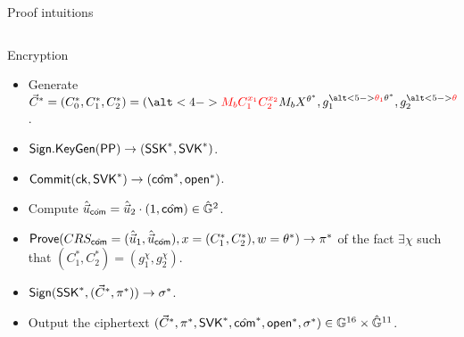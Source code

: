 \begin{frame}{Proof intuitions}
\begin{columns}
\begin{column}{0.5\textwidth}
      Encryption
    \begin{itemize}
    \item Generate $\vec{C}^* = (C_0^*, C_1^*, C_2^*) = (\alt<4->{{\color{red}M_bC_1^{x_1}C_2^{x_2}}}{ M_bX^{\theta^*}}, g_1^{\alt<5->{{\color{red}\theta_1}}{\theta^*}},  g_2^{\alt<5->{{\color{red}\theta_2}}{\theta^*}})$.
    \item ${\mathsf{Sign}}.{\mathsf{KeyGen}}(\mathsf{PP}) \to (\mathsf{SSK}^*, \mathsf{SVK}^*)$.
    \item ${\mathsf{Commit}}(\mathsf{ck}, \mathsf{SVK}^*) \to (\hat{\mathsf{com}}^*, \mathsf{open}^*)$.
    \item Compute $\hat{\vec{u}}_{\hat{\mathsf{com}}} = \hat{\vec{u}}_2 \cdot (1, \hat{\mathsf{com}}) \in \hat{\mathbb{G}}^2$.	
    \item ${\mathsf{Prove}}(CRS_{\hat{\mathsf{com}}}= (\hat{\vec{u}}_1, \hat{\vec{u}}_{\hat{\mathsf{com}}}), x = (C_1^*, C_2^*), w = \theta^*) \to \pi^*$ of the fact $\exists \chi$ such that $(C_1^*, C_2^*) = (g_1^\chi, g_2^\chi)$.
    \item ${\mathsf{Sign}}(\mathsf{SSK}^*,(\vec{C}^*,\pi^*)) \to \sigma^*$.
    \item Output the ciphertext $(\vec{C}^*, \pi^*, \mathsf{SVK}^*, \hat{\mathsf{com}}^*, \mathsf{open}^*, \sigma^*) \in \mathbb{G}^{16} \times \hat{\mathbb{G}}^{11}$.
    \end{itemize}
    \end{column}

  \end{columns}
\end{frame}
